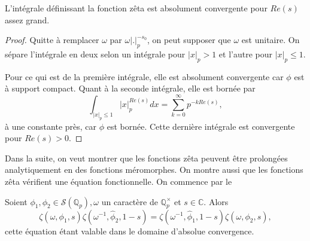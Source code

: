 \begin{lemme}
\label{convergence-gl1}
L'intégrale définissant la fonction zêta est absolument convergente pour $Re(s)$ assez grand.
\end{lemme}

\begin{proof}
Quitte à remplacer $\omega$ par $\omega|.|_p^{-s_0}$, on peut supposer que $\omega$ est unitaire. On sépare l'intégrale en deux selon un intégrale pour $|x|_p > 1$ et l'autre pour $|x|_p \leq 1$. 

Pour ce qui est de la première intégrale, elle est absolument convergente car $\phi$ est à support compact. Quant à la seconde intégrale, elle est bornée par
\begin{equation}
\int_{|x|_p \leq 1} |x|_p^{Re(s)}dx=\sum_{k=0}^{\infty} p^{-kRe(s)},
\end{equation}
à une constante près, car $\phi$ est bornée. Cette dernière intégrale est convergente pour $Re(s) > 0$.
\end{proof}

Dans la suite, on veut montrer que les fonctions zêta peuvent être prolongées analytiquement en des fonctions méromorphes. On montre aussi que les fonctions zêta vérifient une équation fonctionnelle. On commence par le
\begin{lemme}
\label{lemme_fun}
Soient $\phi_1, \phi_2 \in \mathcal{S}(\mathbb{Q}_p), \omega$ un caractère de $\mathbb{Q}_p^\times$ et $s \in \mathbb{C}$. Alors
\begin{equation}
\zeta(\omega, \phi_1, s)\zeta(\omega^{-1}, \hat{\phi}_2, 1-s)=\zeta(\omega^{-1}, \hat{\phi}_1, 1-s)\zeta(\omega, \phi_2, s),
\end{equation}
cette équation étant valable dans le domaine d'absolue convergence.
\end{lemme}


